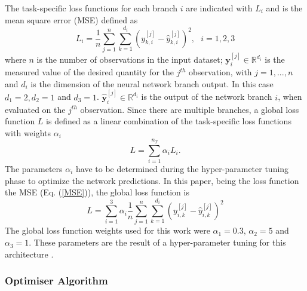 \documentclass[final,5p,times,twocolumn]{elsarticle}
\begin{document}
The task-specific loss functions for each branch $i$ are indicated with $L_i$ and is the mean square error (MSE) defined as
\begin{equation}
L_i = \frac{1}{n} \sum_{j=1}^n \sum_{k=1}^{d_i} (y_{k,i}^{[j]}-\hat y_{k,i}^{[j]})^2, \ \ \ i=1,2,3
\label{MSE}
\end{equation}
where $n$ is the number of observations in the input dataset; ${\pmb y}_i^{[j]} \in \mathbb{R}^{d_i}$ is the measured value of the desired quantity for the $j^{th}$ observation, with $j=1, ..., n$  and $d_i$ is the dimension of the neural network branch output. In this case $d_1=2, d_2=1$ and $d_3=1$. $ \hat {\pmb y}_i^{[j]} \in \mathbb{R}^{d_i}$ is the output of the network branch $i$, when evaluated on the $j^{th}$ observation. Since there are multiple branches, a global loss function $L$ is defined as a linear combination of the task-specific loss functions with weights $\alpha_i$ 
\begin{equation}
L = \sum_{i=1}^{n_T}\alpha_i L_i .
\label{globalcf}
\end{equation}
The parameters $\alpha_i$ have to be determined during the hyper-parameter tuning phase to optimize the network predictions.
In this paper, being the loss function the MSE (Eq. (\ref{MSE})), the global loss function is
\begin{equation}
L = \sum_{i=1}^{3}\alpha_i \frac{1}{n} \sum_{j=1}^n \sum_{k=1}^{d_i} (y_{i,k}^{[j]}-\hat y_{i,k}^{[j]})^2
\end{equation}
The global loss function weights used for this work were $\alpha_1 = 0.3$, $\alpha_2 = 5$ and $\alpha_3 = 1$. These parameters are the result of a hyper-parameter tuning for this architecture \cite{Michelucci2019_2}.
 

\subsubsection{Optimiser Algorithm}
\label{training}
\end{document}
